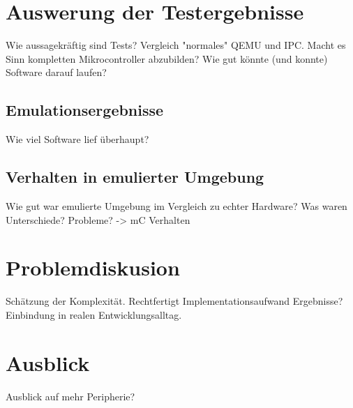 \section{Auswerung der Testergebnisse}
Wie aussagekräftig sind Tests?
Vergleich "normales" QEMU und IPC.
Macht es Sinn kompletten Mikrocontroller abzubilden?
Wie gut könnte (und konnte) Software darauf laufen?

\subsection{Emulationsergebnisse}
Wie viel Software lief überhaupt?

\subsection{Verhalten in emulierter Umgebung}
Wie gut war emulierte Umgebung im Vergleich zu echter Hardware?
Was waren Unterschiede?
Probleme? -> mC Verhalten

\section{Problemdiskusion}
Schätzung der Komplexität.
Rechtfertigt Implementationsaufwand Ergebnisse?
Einbindung in realen Entwicklungsalltag.

\section{Ausblick}
Ausblick auf mehr Peripherie?

